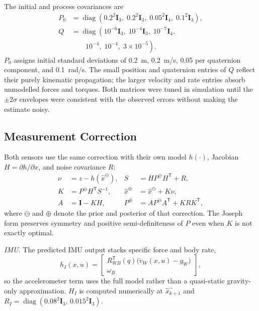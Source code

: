 \documentclass[conference]{IEEEtran}
\newcommand{\T}{^{\mathsf T}}
\newcommand{\I}{\mathbf I}
\newcommand{\diag}{\operatorname{diag}}
\begin{document}
The initial and process covariances are
\begin{align}
P_0&=\diag\!\left(0.2^2\I_3,\;0.2^2\I_3,\;0.05^2\I_4,\;0.1^2\I_3\right),\label{eq:P0}\\
Q&=\diag\!\left(10^{-6}\I_3,\;10^{-4}\I_3,\;10^{-7}\I_4,\right.\nonumber\\
&\qquad\left.10^{-4},\;10^{-4},\;3\!\times\!10^{-5}\right).\label{eq:Q}
\end{align}
$P_0$ assigns initial standard deviations of \SI{0.2}{m}, \SI{0.2}{m/s}, 0.05 per quaternion component, and \SI{0.1}{rad/s}. The small position and quaternion entries of $Q$ reflect their purely kinematic propagation; the larger velocity and rate entries absorb unmodelled forces and torques. Both matrices were tuned in simulation until the $\pm2\sigma$ envelopes were consistent with the observed errors without making the estimate noisy.

\subsection{Measurement Correction}
Both sensors use the same correction with their own model $h(\cdot)$, Jacobian $H=\partial h/\partial x$, and noise covariance $R$:
\begin{equation}
\begin{aligned}
\nu &= z-h(\hat x^{\ominus}), & S &= HP^{\ominus}H\T+R,\\
K &= P^{\ominus}H\T S^{-1}, & \hat x^{\oplus}&=\hat x^{\ominus}+K\nu,\\
A &= \I-KH, & P^{\oplus}&=AP^{\ominus}A\T+KRK\T,
\end{aligned}
\label{eq:update}
\end{equation}
where $\ominus$ and $\oplus$ denote the prior and posterior of that correction. The Joseph form preserves symmetry and positive semi-definiteness of $P$ even when $K$ is not exactly optimal.

\textit{IMU.} The predicted IMU output stacks specific force and body rate,
\begin{equation}
h_I(x,u)=\begin{bmatrix}R_{WB}\T(q)\bigl(\dot v_W(x,u)-g_W\bigr)\\ \omega_B\end{bmatrix},
\label{eq:hI}
\end{equation}
so the accelerometer term uses the full model rather than a quasi-static gravity-only approximation. $H_I$ is computed numerically at $\hat x^-_{k+1}$ and $R_I=\diag(0.08^2\I_3,\,0.015^2\I_3)$.
\end{document}
